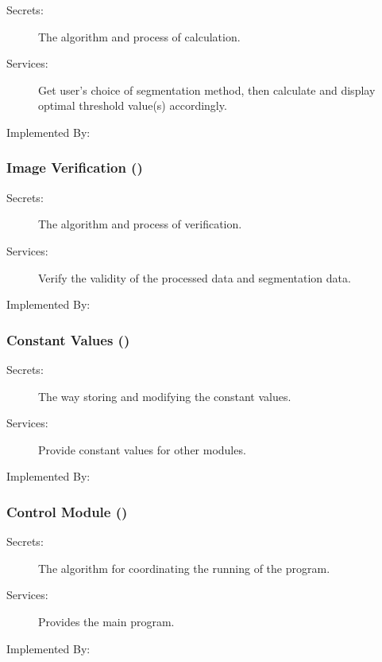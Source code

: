 \documentclass[12pt, titlepage]{article}
\begin{document}
\begin{description}
\item[Secrets:]The algorithm and process of calculation.
\item[Services:]Get user's choice of segmentation method, then calculate and
display optimal threshold value(s) accordingly.

\item[Implemented By:] \progname{}
\end{description}

\subsubsection{Image Verification ()}

\begin{description}
\item[Secrets:]The algorithm and process of verification.
\item[Services:]Verify the validity of the processed data and segmentation
data.\item[Implemented By:] \progname{}
\end{description}

\subsubsection{Constant Values ()}

\begin{description}
\item[Secrets:]The way storing and modifying the constant values.
\item[Services:]Provide constant values for other modules.
\item[Implemented By:] \progname{}
\end{description}

\subsubsection{Control Module ()}

\begin{description}
\item[Secrets:]The algorithm for coordinating the running of the program.
\item[Services:]Provides the main program.
\item[Implemented By:] \progname{}
\end{description}
\end{document}
